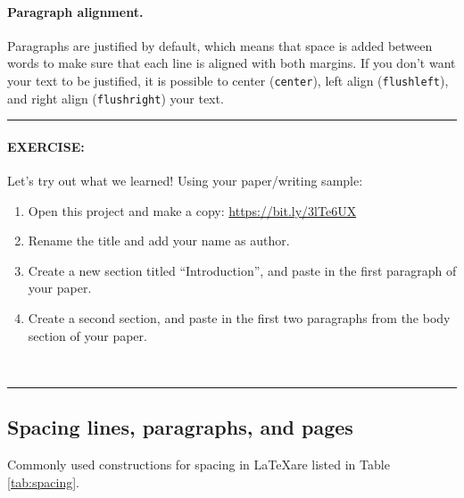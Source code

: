 \documentclass[11pt]{article}
\begin{document}
\paragraph{Paragraph alignment.} Paragraphs are justified by default, which means that space is added between words to make sure that each line is aligned with both margins. If you don't want your text to be justified, it is possible to center (\verb|center|), left align (\verb|flushleft|), and right align (\verb|flushright|) your text.
\\\vspace{0.7em}

\hrule
\paragraph{EXERCISE:} Let's try out what we learned! Using your paper/writing sample:

\begin{enumerate}[noitemsep]
    \item Open this project and make a copy: \href{https://bit.ly/3lTe6UX}{https://bit.ly/3lTe6UX}
    \item Rename the title and add your name as author.
    \item Create a new section titled ``Introduction'', and paste in the first paragraph of your paper. 
    \item Create a second section, and paste in the first two paragraphs from the body section of your paper.
\end{enumerate}
\\\vspace{0.5em}
\hrule


\subsection*{Spacing lines, paragraphs, and pages}


Commonly used constructions for spacing in \LaTeX are listed in Table \ref{tab:spacing}.
\end{document}

